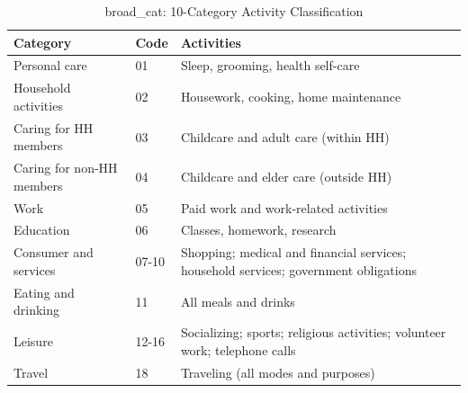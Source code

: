 \begin{table}[ht]
\centering
\begin{tabular}{lll}
  \hline
Category & Code & Activities \\ 
  \hline
Personal care & 01 & Sleep, grooming, health self-care \\ 
  Household activities & 02 & Housework, cooking, home maintenance \\ 
  Caring for HH members & 03 & Childcare and adult care (within HH) \\ 
  Caring for non-HH members & 04 & Childcare and elder care (outside HH) \\ 
  Work & 05 & Paid work and work-related activities \\ 
  Education & 06 & Classes, homework, research \\ 
  Consumer and services & 07-10 & Shopping; medical and financial services; household services; government obligations \\ 
  Eating and drinking & 11 & All meals and drinks \\ 
  Leisure & 12-16 & Socializing; sports; religious activities; volunteer work; telephone calls \\ 
  Travel & 18 & Traveling (all modes and purposes) \\ 
   \hline
\end{tabular}
\caption{broad\_cat: 10-Category Activity Classification} 
\label{tab:broad_cat}
\end{table}
